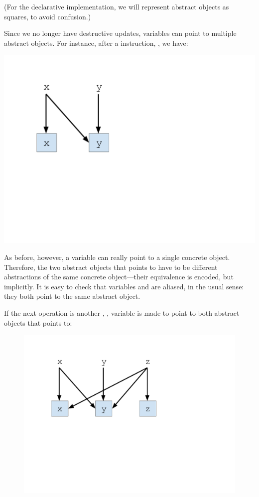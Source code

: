 (For the declarative implementation, we will represent abstract objects
as squares, to avoid confusion.)

Since we no longer have destructive updates, variables can point
to multiple abstract objects. For instance, after a  instruction,
, we have:

  \begin{minipage}[b]{\linewidth}
    \centering
    \includegraphics[trim={30mm 90mm 140mm 25mm},clip,width=0.32\linewidth]{assets/must-data/decl-alias-graph1.pdf}
  \end{minipage}

As before, however, a variable can really point to a single concrete
object. Therefore, the two abstract objects that  points to have
to be different abstractions of the same concrete object---their
equivalence is encoded, but implicitly. It is easy to check that
variables  and  are aliased, in the usual sense: they both
point to the same abstract object.

If the next operation is another , , variable
 is made to point to both abstract objects that  points to:

\begin{figure}[h]
  \begin{minipage}[b]{\linewidth}
    \centering
    \includegraphics[trim={25mm 85mm 70mm 25mm},clip,width=0.6\linewidth]{assets/must-data/decl-alias-graph2.pdf}
  \end{minipage}
\end{figure}

